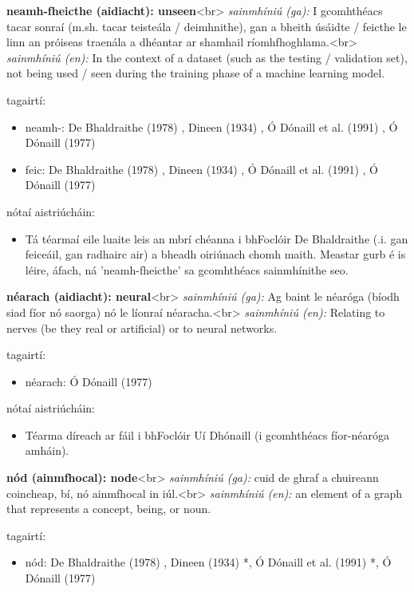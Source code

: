 \documentclass{article}
\begin{document}
\textbf{neamh-fheicthe (aidiacht): unseen}<br>
\textit{sainmhíniú (ga):} I gcomhthéacs tacar sonraí (m.sh. tacar teisteála / deimhnithe), gan a bheith úsáidte / feicthe le linn an próiseas traenála a dhéantar ar shamhail ríomhfhoghlama.<br>
\textit{sainmhíniú (en):} In the context of a dataset (such as the testing / validation set), not being used / seen during the training phase of a machine learning model.

tagairtí:
\begin{itemize}
	\item neamh-: De Bhaldraithe (1978) \cite{de-bhaldraithe}, Dineen (1934) \cite{dineen}, Ó Dónaill et al. (1991) \cite{focloir-beag}, Ó Dónaill (1977) \cite{odonaill}
	\item feic: De Bhaldraithe (1978) \cite{de-bhaldraithe}, Dineen (1934) \cite{dineen}, Ó Dónaill et al. (1991) \cite{focloir-beag}, Ó Dónaill (1977) \cite{odonaill}
\end{itemize}

nótaí aistriúcháin:
\begin{itemize}
	\item Tá téarmaí eile luaite leis an mbrí chéanna i bhFoclóir De Bhaldraithe (.i. gan feiceáil, gan radhairc air) a bheadh oiriúnach chomh maith. Meastar gurb é is léire, áfach, ná 'neamh-fheicthe' sa gcomhthéacs sainmhínithe seo.
\end{itemize}


\textbf{néarach (aidiacht): neural}<br>
\textit{sainmhíniú (ga):} Ag baint le néaróga (bíodh siad fíor nó saorga) nó le líonraí néaracha.<br>
\textit{sainmhíniú (en):} Relating to nerves (be they real or artificial) or to neural networks.

tagairtí:
\begin{itemize}
	\item néarach: Ó Dónaill (1977) \cite{odonaill}
\end{itemize}

nótaí aistriúcháin:
\begin{itemize}
	\item Téarma díreach ar fáil i bhFoclóir Uí Dhónaill (i gcomhthéacs fíor-néaróga amháin).
\end{itemize}


\textbf{nód (ainmfhocal): node}<br>
\textit{sainmhíniú (ga):} cuid de ghraf a chuireann coincheap, bí, nó ainmfhocal in iúl.<br>
\textit{sainmhíniú (en):} an element of a graph that represents a concept, being, or noun.

tagairtí:
\begin{itemize}
	\item nód: De Bhaldraithe (1978) \cite{de-bhaldraithe}, Dineen (1934) \cite{dineen}*, Ó Dónaill et al. (1991) \cite{focloir-beag}*, Ó Dónaill (1977) \cite{odonaill}
\end{itemize}
\end{document}
